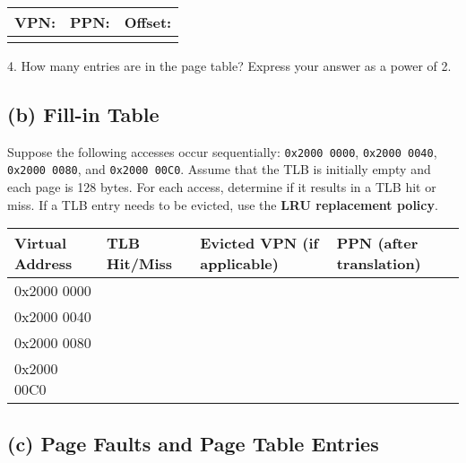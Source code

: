 \documentclass{article}
\begin{document}
\begin{center}
    \begin{tabular}{|c|c|c|}
        \hline
        \textbf{VPN:} & \textbf{PPN:} & \textbf{Offset:} \\
        \hline
        \hspace{2cm} & \hspace{2cm} & \hspace{2cm} \\
        \hline
    \end{tabular}
    \vspace{0.4cm}
\end{center}



4. How many entries are in the page table? Express your answer as a power of 2.

\vspace{1.2cm}

\subsection*{(b) Fill-in Table}

Suppose the following accesses occur sequentially: \texttt{0x2000 0000}, \texttt{0x2000 0040}, \texttt{0x2000 0080}, and \texttt{0x2000 00C0}. Assume that the TLB is initially empty and each page is 128 bytes. For each access, determine if it results in a TLB hit or miss. If a TLB entry needs to be evicted, use the \textbf{LRU replacement policy}.

\begin{center}
    \renewcommand{\arraystretch}{2.5}  %
    \begin{tabular}{|p{3cm}|p{3cm}|p{3.5cm}|p{3cm}|}
        \hline
        \textbf{Virtual Address} & \textbf{TLB Hit/Miss} & \textbf{Evicted VPN (if applicable)} & \textbf{PPN (after translation)} \\
        \hline
        0x2000 0000 & & & \\
        \hline
        0x2000 0040 & & & \\
        \hline
        0x2000 0080 & & & \\
        \hline
        0x2000 00C0 & & & \\
        \hline
    \end{tabular}
\end{center}

\vspace{1cm}

\subsection*{(c) Page Faults and Page Table Entries}
\end{document}
